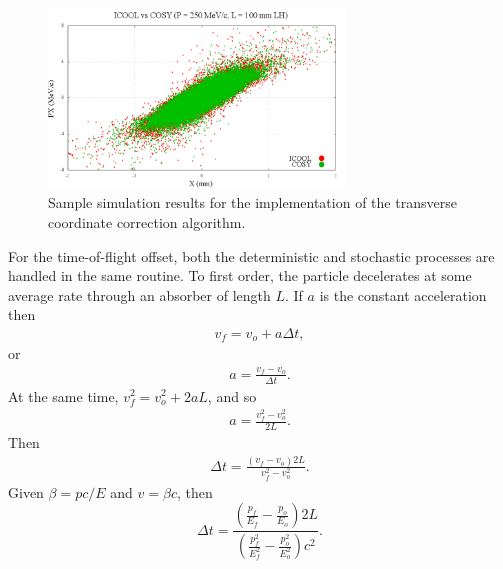 \begin{figure}[H]
  \centering
    \includegraphics[width=0.7\textwidth]{Figures/xpx_phase_space_implemented} 
  \caption{Sample simulation results for the implementation of the transverse coordinate correction algorithm.}
  \label{fig:xpx_phase_space_implemented}
\end{figure}
%
%
\label{sec:COSYTemporalDisplacement}\par
For the time-of-flight offset, both the deterministic and stochastic processes are handled in the same routine. To first order, the particle decelerates at some  average rate through an absorber of length $L$. If $a$ is the constant acceleration then 
\begin{align*}
v_f=v_o+a\Delta t,
\end{align*}
or 
\begin{align*}
a=\frac{v_f-v_o}{\Delta t}.
\end{align*}
At the same time, $v_f ^2 = v_o ^2 + 2 a L$, and so
\begin{align*}
 a=\frac{v_f ^2 - v_o ^2}{2L}.
\end{align*}
Then
\begin{align*}
\Delta t = \frac{(v_f-v_o)2L}{v_f^2-v_o^2}.
\end{align*}
Given $\beta=pc/E$ and $v=\beta c$, then
\begin{equation}\label{eqn:cosyDeltaT}
\Delta t=\frac{(\frac{p_f}{E_f}-\frac{p_o}{E_o})2L}{(\frac{p_f ^2}{E_f ^2}-\frac{p_o ^2}{E_o ^2})c^2}.
\end{equation}

